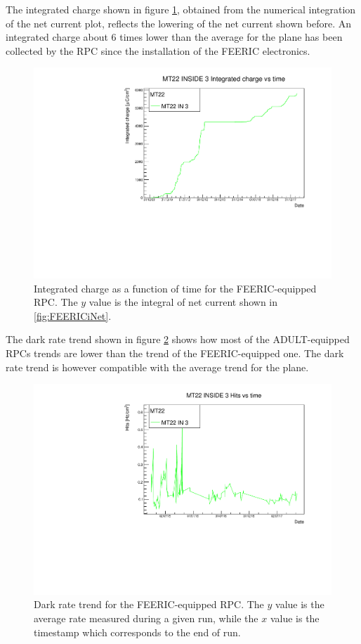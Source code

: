 The integrated charge shown in figure \ref{fig:FEERICIntCharge}, obtained from the numerical integration of the net current plot, reflects the lowering of the net current shown before.
An integrated charge about $6$ times lower than the average for the plane has been collected by the RPC since the installation of the FEERIC electronics.

\begin{figure}[!t]
\begin{center}
\includegraphics[width=0.7\linewidth]{Chapters/Performance/Figs/IntChargeFEERIC.pdf}
\caption{Integrated charge as a function of time for the FEERIC-equipped RPC. The $y$ value is the integral of net current shown in \ref{fig:FEERICiNet}.}
\label{fig:FEERICIntCharge}
\end{center}
\end{figure}

The dark rate trend shown in figure \ref{fig:FEERICDarkRate} shows how most of the ADULT-equipped RPCs trends are lower than the trend of the FEERIC-equipped one.
The dark rate trend is however compatible with the average trend for the plane.

\begin{figure}[!t]
\begin{center}
\includegraphics[width=0.7\linewidth]{Chapters/Performance/Figs/DarkRateFEERIC.pdf}
\caption{Dark rate trend for the FEERIC-equipped RPC. The $y$ value is the average rate measured during a given run, while the $x$ value is the timestamp which corresponds to the end of run.}
\label{fig:FEERICDarkRate}
\end{center}
\end{figure}

